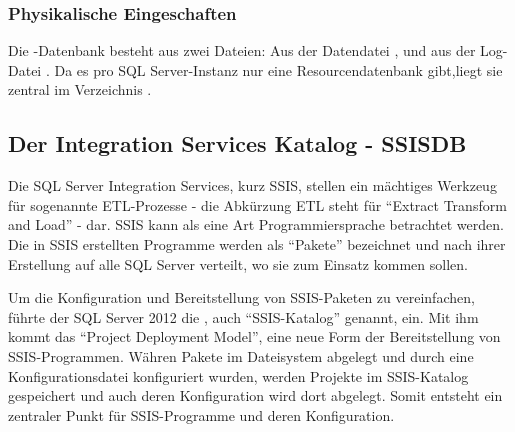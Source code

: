         \subsubsection{Physikalische Eingeschaften}
          Die -Datenbank besteht aus zwei
          Dateien: Aus der Datendatei
          , und aus der
          Log-Datei . Da es pro SQL
          Server-Instanz nur eine Resourcendatenbank gibt,liegt sie zentral im
          Verzeichnis .
          \begin{literaturinternet}
            \item \cite{ms190940}
          \end{literaturinternet}          
      \subsection{Der Integration Services Katalog - SSISDB}
        Die SQL Server Integration Services, kurz SSIS, stellen ein mächtiges
        Werkzeug f\"ur sogenannte ETL-Prozesse - die Abkürzung ETL steht 
        f\"ur \enquote{Extract Transform and Load} - dar. SSIS kann als eine Art
        Programmiersprache betrachtet werden. Die in SSIS erstellten Programme
        werden als \enquote{Pakete} bezeichnet und nach ihrer Erstellung auf
        alle SQL Server verteilt, wo sie zum Einsatz kommen sollen.
        
        Um die Konfiguration und Bereitstellung von SSIS-Paketen zu
        vereinfachen, führte der SQL Server 2012 die , auch
        \enquote{SSIS-Katalog} genannt, ein. Mit ihm kommt das \enquote{Project
        Deployment Model}, eine neue Form der Bereitstellung von
        SSIS-Programmen. Währen Pakete im Dateisystem abgelegt und durch eine
        Konfigurationsdatei konfiguriert wurden, werden Projekte im SSIS-Katalog
        gespeichert und auch deren Konfiguration wird dort abgelegt. Somit
        entsteht ein zentraler Punkt f\"ur SSIS-Programme und deren Konfiguration.
        
